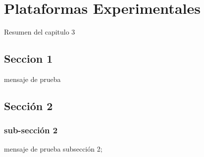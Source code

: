 \chapter{Plataformas Experimentales}
\label{capitulo3}

Resumen del capitulo 3

\section{Seccion 1}
mensaje de prueba

\section{Sección 2}
\subsection{sub-sección 2}
mensaje de prueba subsección 2;

